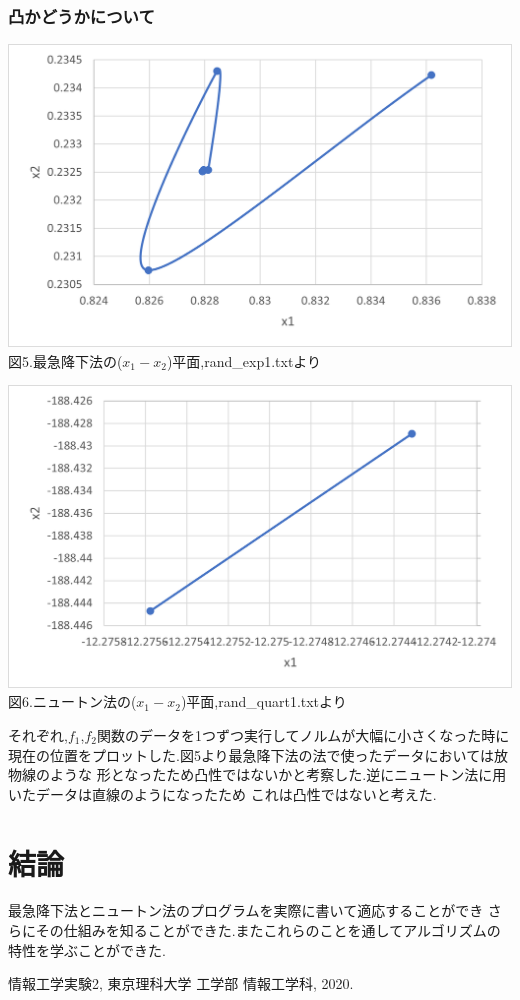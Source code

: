 \documentclass[12pt]{jarticle}
\begin{document}
\subsubsection{凸かどうかについて}
\begin{center}
    \includegraphics[width=15cm,clip]{5.png}\\
    図5.最急降下法の($x_1-x_2$)平面,rand\_exp1.txtより\\
\end{center}
\begin{center}
    \includegraphics[width=15cm,clip]{6.png}\\
    図6.ニュートン法の($x_1-x_2$)平面,rand\_quart1.txtより\\
\end{center}
それぞれ,$f_1$,$f_2$関数のデータを1つずつ実行してノルムが大幅に小さくなった時に
現在の位置をプロットした.図5より最急降下法の法で使ったデータにおいては放物線のような
形となったため凸性ではないかと考察した.逆にニュートン法に用いたデータは直線のようになったため
これは凸性ではないと考えた.
\section{結論}
最急降下法とニュートン法のプログラムを実際に書いて適応することができ
さらにその仕組みを知ることができた.またこれらのことを通してアルゴリズムの特性を学ぶことができた.
\begin{thebibliography}{99}
    \label{sannkoubunnkenn_chapter}
    情報工学実験2,
    東京理科大学 工学部 情報工学科, 2020.
\end{thebibliography}
\clearpage
\appendix
\end{document}
